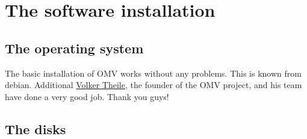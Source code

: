 

\section{The software installation}

\subsection{The operating system}

The basic installation of \gls{OMV} works without any problems. This is known
from debian. Additional \href{https://www.openmediavault.org/?page_id=1206}{Volker Theile},
the founder of the \gls{OMV} project, and his team have done a very good job.
Thank you guys!


\subsection{The disks}

